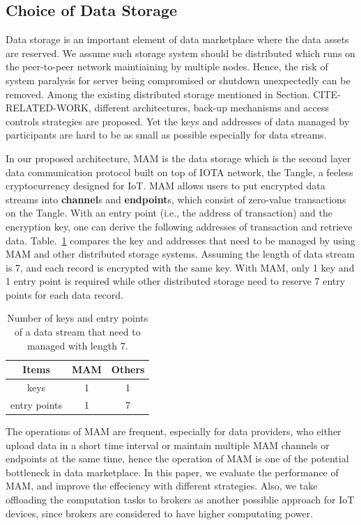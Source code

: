 \documentclass[conference]{IEEEtran}
\begin{document}
\subsection{Choice of Data Storage}
Data storage is an important element of data marketplace where the data assets are reserved. We assume such storage system should be distributed which runs on the peer-to-peer network maintiaining by multiple nodes. Hence, the risk of system paralysis for server being compromised or shutdown unexpectedly can be removed. Among the existing distributed storage mentioned in Section. CITE-RELATED-WORK, different architectures, back-up mechanisms and access controls strategies are proposed. Yet the keys and addresses of data managed by participants are hard to be as small as possible especially for data streams.  

In our proposed architecture, MAM is the data storage which is the second layer data communication protocol built on top of IOTA\cite{IOTAwhitepaper} network, the Tangle, a feeless cryptocurrency designed for IoT. MAM allows users to put encrypted data streams into \textbf{channel}s and \textbf{endpoint}s, which consist of zero-value transactions on the Tangle. With an entry point (i.e., the address of transaction) and the encryption key, one can derive the following addresses of transaction and retrieve data. Table.~\ref{tab:mam_scalability} compares the key and addresses that need to be managed by using MAM and other distributed storage systems. Assuming the length of data stream is 7, and each record is encrypted with the same key. With MAM, only 1 key and 1 entry point is required while other distributed storage need to reserve 7 entry points for each data record.

\begin{table}[htbp]
	\caption{Number of keys and entry points of a data stream that need to managed with length 7.}
	\label{tab:mam_scalability}
	\begin{center}
	\begin{tabular}{|c|c|c|}
	\hline
		\textbf{Items} & \textbf{MAM} & \textbf{Others} \\ 
		\hline
		keys & 1 & 1 \\ 
		\hline
		entry points & 1 & 7 \\ 
		\hline
	\end{tabular}
	\end{center}
\end{table}

The operations of MAM are frequent, especially for data providers, who either upload data in a short time interval or maintain multiple MAM channels or endpoints at the same time, hence the operation of MAM is one of the potential bottleneck in data marketplace. In this paper, we evaluate the performance of MAM, and improve the effeciency with different strategies. Also, we take offloading the computation tasks to brokers as another possiblie approach for IoT devices, since brokers are considered to have higher computating power.
\end{document}

